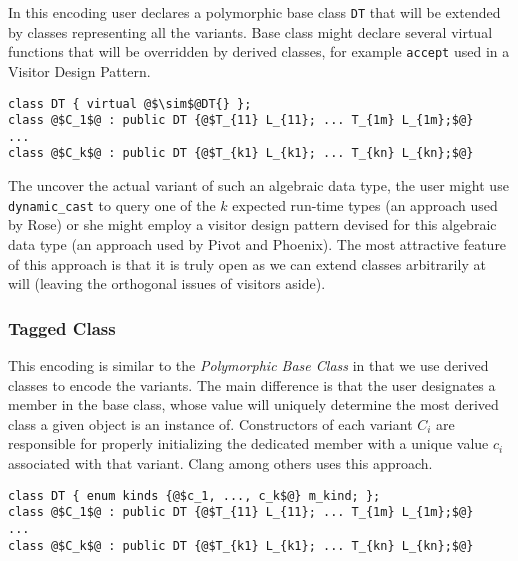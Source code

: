 \documentclass[preprint]{sigplanconf}
\makeatletter
\DeclareRobustCommand{\code}[1]{{\lstinline[breaklines=false,escapechar=@]{#1}}}
\makeatother
\begin{document}
In this encoding user declares a polymorphic base class \code{DT} that will 
be extended by classes representing all the variants. Base class might declare 
several virtual functions that will be overridden by derived classes, for example 
\code{accept} used in a Visitor Design Pattern.

\begin{lstlisting}[keepspaces,columns=flexible]
class DT { virtual @$\sim$@DT{} };
class @$C_1$@ : public DT {@$T_{11} L_{11}; ... T_{1m} L_{1m};$@} 
...
class @$C_k$@ : public DT {@$T_{k1} L_{k1}; ... T_{kn} L_{kn};$@} 
\end{lstlisting}

The uncover the actual variant of such an algebraic data type, the user might 
use \code{dynamic_cast} to query one of the $k$ expected run-time types (an 
approach used by Rose\cite{SQ03}) or she might employ a visitor design pattern 
devised for this algebraic data type (an approach used by Pivot\cite{Pivot09} 
and Phoenix\cite{Phoenix}). The most attractive feature of this approach is that 
it is truly open as we can extend classes arbitrarily at will (leaving the 
orthogonal issues of visitors aside).

\subsubsection{Tagged Class}
\label{sec:tc}

This encoding is similar to the \emph{Polymorphic Base Class} in that we use 
derived classes to encode the variants. The main difference is that the user 
designates a member in the base class, whose value will uniquely 
determine the most derived class a given object is an instance of. Constructors 
of each variant $C_i$ are responsible for properly initializing the dedicated 
member with a unique value $c_i$ associated with that variant. Clang\cite{Clang} 
among others uses this approach.

\begin{lstlisting}[keepspaces,columns=flexible]
class DT { enum kinds {@$c_1, ..., c_k$@} m_kind; };
class @$C_1$@ : public DT {@$T_{11} L_{11}; ... T_{1m} L_{1m};$@} 
...
class @$C_k$@ : public DT {@$T_{k1} L_{k1}; ... T_{kn} L_{kn};$@} 
\end{lstlisting}
\end{document}
